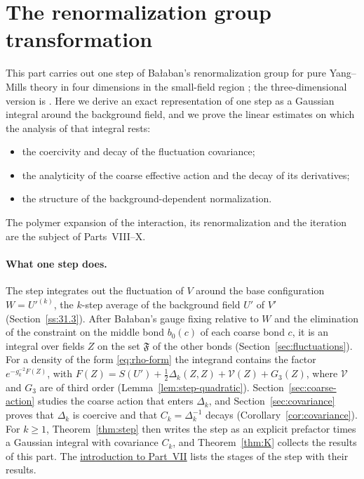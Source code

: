 \section{The renormalization group transformation}\label{sec:rg-step}

This part carries out one step of Ba\l aban's renormalization group for pure Yang--Mills theory in four dimensions in the small-field region \cite{BalYM4I,BalYM4II}; the three-dimensional version is \cite{BalUV3}. Here we derive an exact representation of one step as a Gaussian integral around the background field, and we prove the linear estimates on which the analysis of that integral rests:
\begin{itemize}
\item the coercivity and decay of the fluctuation covariance;
\item the analyticity of the coarse effective action and the decay of its derivatives;
\item the structure of the background-dependent normalization.
\end{itemize}
The polymer expansion of the interaction, its renormalization and the iteration are the subject of Parts~VIII--X.

\paragraph{What one step does.} The step integrates out the fluctuation of $V$ around the base configuration $W=U'^{(k)}$, the $k$-step average of the background field $U'$ of $V'$ (Section~\ref{ss:31.3}). After Ba\l aban's gauge fixing relative to $W$ and the elimination of the constraint on the middle bond $b_0(c)$ of each coarse bond $c$, it is an integral over fields $Z$ on the set $\mathfrak F$ of the other bonds (Section~\ref{sec:fluctuations}). For a density of the form \eqref{eq:rho-form} the integrand contains the factor $e^{-g_k^{-2}F(Z)}$, with $F(Z)=S(U')+\frac12\Delta_k(Z,Z)+\mathcal V(Z)+G_3(Z)$, where $\mathcal V$ and $G_3$ are of third order (Lemma~\ref{lem:step-quadratic}). Section~\ref{sec:coarse-action} studies the coarse action that enters $\Delta_k$, and Section~\ref{sec:covariance} proves that $\Delta_k$ is coercive and that $C_k=\Delta_k^{-1}$ decays (Corollary~\ref{cor:covariance}). For $k\ge1$, Theorem~\ref{thm:step} then writes the step as an explicit prefactor times a Gaussian integral with covariance $C_k$, and Theorem~\ref{thm:K} collects the results of this part. The \hyperref[intro:VII]{introduction to Part~VII} lists the stages of the step with their results.

